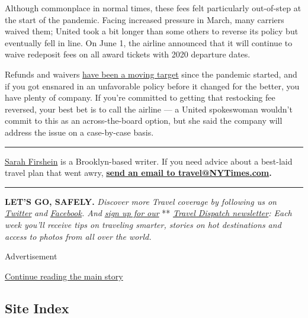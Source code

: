 Although commonplace in normal times, these fees felt particularly
out-of-step at the start of the pandemic. Facing increased pressure in
March, many carriers waived them; United took a bit longer than some
others to reverse its policy but eventually fell in line. On June 1, the
airline announced that it will continue to waive redeposit fees on all
award tickets with 2020 departure dates.

Refunds and waivers
\href{https://www.nytimes3xbfgragh.onion/2020/04/11/travel/coronavirus-travel-trip-refunds.html}{have
been a moving target} since the pandemic started, and if you got
ensnared in an unfavorable policy before it changed for the better, you
have plenty of company. If you're committed to getting that restocking
fee reversed, your best bet is to call the airline --- a United
spokeswoman wouldn't commit to this as an across-the-board option, but
she said the company will address the issue on a case-by-case basis.

\begin{center}\rule{0.5\linewidth}{\linethickness}\end{center}

\href{https://twitter.com/sfirshein?lang=en}{Sarah Firshein} is a
Brooklyn-based writer. If you need advice about a best-laid travel plan
that went awry, \textbf{\href{mailto:travel@NYTimes.com}{send an email
to travel@NYTimes.com}.}

\begin{center}\rule{0.5\linewidth}{\linethickness}\end{center}

\textbf{LET'S GO, SAFELY.} \emph{Discover more Travel coverage by
following us on}
\href{https://twitter.com/nytimestravel}{\emph{Twitter}} \emph{and}
\href{https://www.facebookcorewwwi.onion/nytimestravel/}{\emph{Facebook}}\emph{.
And}
\href{https://www.nytimes3xbfgragh.onion/newsletters/traveldispatch?action=click\&module=inline\&pgtype=Article}{\emph{sign
up for our}} **
\href{https://www.nytimes3xbfgragh.onion/newsletters/traveldispatch}{\emph{Travel
Dispatch newsletter}}\emph{: Each week you'll receive tips on traveling
smarter, stories on hot destinations and access to photos from all over
the world.}

Advertisement

\protect\hyperlink{after-bottom}{Continue reading the main story}

\hypertarget{site-index}{%
\subsection{Site Index}\label{site-index}}

